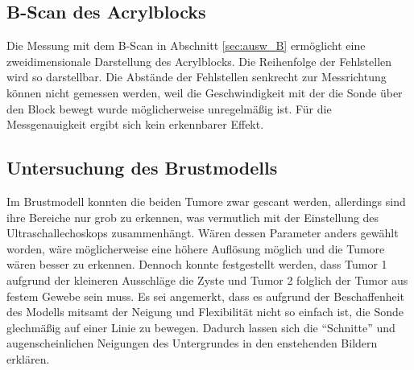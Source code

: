 \subsection{B-Scan des Acrylblocks}
Die Messung mit dem B-Scan in Abschnitt \ref{sec:ausw_B} ermöglicht eine zweidimensionale Darstellung des Acrylblocks. 
Die Reihenfolge der Fehlstellen wird so darstellbar.
Die Abstände der Fehlstellen senkrecht zur Messrichtung können nicht gemessen werden,
weil die Geschwindigkeit mit der die Sonde über den Block bewegt wurde möglicherweise unregelmäßig ist.
Für die Messgenauigkeit ergibt sich kein erkennbarer Effekt.

\subsection{Untersuchung des Brustmodells}
Im Brustmodell konnten die beiden Tumore zwar gescant werden, allerdings sind ihre Bereiche nur grob zu erkennen,
was vermutlich mit der Einstellung des Ultraschallechoskops zusammenhängt.
Wären dessen Parameter anders gewählt worden, wäre möglicherweise eine höhere Auflösung möglich und die Tumore wären besser zu erkennen.
Dennoch konnte festgestellt werden, dass Tumor 1 aufgrund der kleineren Ausschläge die Zyste und Tumor 2 folglich der Tumor aus 
festem Gewebe sein muss.
Es sei angemerkt, dass es aufgrund der Beschaffenheit des Modells mitsamt der Neigung und Flexibilität nicht so einfach ist,
die Sonde glechmäßig auf einer Linie zu bewegen. 
Dadurch lassen sich die \enquote{Schnitte} und augenscheinlichen Neigungen des Untergrundes in den enstehenden Bildern erklären.
